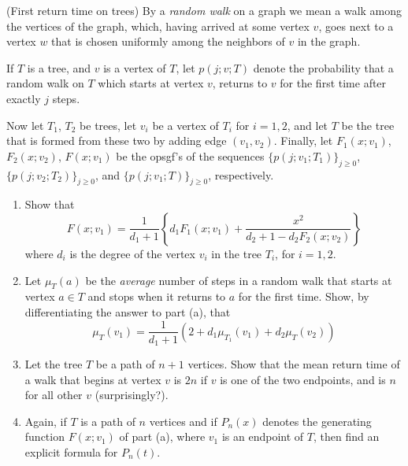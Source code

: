 \begin{exercise}
    (First return time on trees) By a \emph{random walk} on a graph we mean a walk among the vertices of the graph, which, having arrived at some vertex $v$, goes next to a vertex $w$ that is chosen uniformly among the neighbors of $v$ in the graph.

    If $T$ is a tree, and $v$ is a vertex of $T$, let $p(j;v;T)$ denote the probability that a random walk on $T$ which starts at vertex $v$, returns to $v$ for the first time after exactly $j$ steps.

    Now let $T_1$, $T_2$ be trees, let $v_i$ be a vertex of $T_i$ for $i=1,2$, and let $T$ be the tree that is formed from these two by adding edge $(v_1, v_2)$. Finally, let $F_1(x;v_1)$, $ F_2(x;v_2)$, $F(x;v_1)$ be the opsgf's of the sequences $\{p(j;v_1;T_1)\}_{j\geq0}$, $\{p(j;v_2;T_2)\}_{j\geq0}$, and $\{p(j;v_1;T)\}_{j\geq0}$, respectively.
    \begin{enumerate}[label=(\alph*)]
        \item Show that 
        \[
            F(x;v_1) = \frac{1}{d_1+1}\left\{d_1F_1(x;v_1) + \frac{x^2}{d_2+1-d_2F_2(x;v_2)}\right\}
        \]
        where $d_i$ is the degree of the vertex $v_i$ in the tree $T_i$, for $i=1,2$.
        \item Let $\mu_T(a)$ be the \emph{average} number of steps in a random walk that starts at vertex $a\in T$ and stops when it returns to $a$ for the first time. Show, by differentiating the answer to part (a), that
        \[
            \mu_T(v_1) = \frac{1}{d_1+1}(2+d_1\mu_{T_1}(v_1) + d_2\mu_T(v_2))
        \]
        \item Let the tree $T$ be a path of $n+1$ vertices. Show that the mean return time of a walk that begins at vertex $v$ is $2n$ if $v$ is one of the two endpoints, and is $n$ for all other $v$ (surprisingly?).
        \item Again, if $T$ is a path of $n$ vertices and if $P_n(x)$ denotes the generating function $F(x;v_1)$ of part (a), where $v_1$ is an endpoint of $T$, then find an explicit formula for $P_n(t)$.
    \end{enumerate}
\end{exercise}
